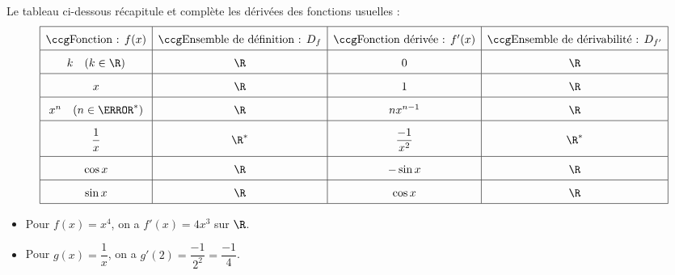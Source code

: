 \begin{prop}
	Le tableau ci-dessous récapitule et complète les dérivées des fonctions usuelles :
	\[
		\def\arraystretch{1.7}
		\begin{array}{|c|c|c|c|} \hline
			\ccg \text{Fonction : } f(x)       & \ccg\text{Ensemble de définition : } D_f & \ccg\text{Fonction dérivée : } f'(x) & \ccg\text{Ensemble de dérivabilité : } D_{f'} \\ \hline
			k \quad (k \in \R)                 & \R                                       & 0                                    & \R                                            \\ \hline
			x                                  & \R                                       & 1                                    & \R                                            \\ \hline
			x^n \quad (n \in \N^*)             & \R                                       & n x^{n-1}                            & \R                                            \\ \hline
			\rule[-4mm]{0mm}{11mm}\dfrac{1}{x} & \R^*                                     & \dfrac{-1}{x^2}                      & \R^*                                          \\ \hline
			\cos x                             & \R                                       & -\sin x                              & \R                                            \\ \hline
			\sin x                             & \R                                       & \cos x                               & \R                                            \\ \hline
		\end{array}
	\]
\end{prop}

\begin{ex}
	\nline
	\begin{itemize}
		\item Pour $f(x) = x^4$, on a $f'(x) = 4x^3$ sur $\R$.
		\item Pour $g(x) = \dfrac{1}{x}$, on a $g'(2) = \dfrac{-1}{2^2} = \dfrac{-1}{4}$.
	\end{itemize}
\end{ex}

